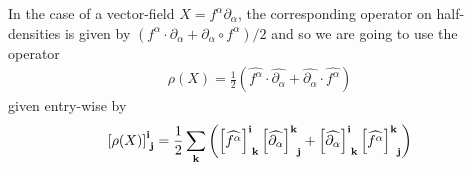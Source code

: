\documentclass[12pt]{amsart}
\begin{document}
In the case of a vector-field $X = f^\alpha \partial_\alpha$, the corresponding operator on half-densities is given by $ (f^\alpha \cdot \partial_\alpha + \partial_\alpha \circ f^\alpha)/2$
and so we are going to use the operator
\begin{align*}
	\rho(X) = \frac{1}{2} \left( \widehat{f^\alpha}  \cdot \widehat{\partial_{\alpha}} + \widehat{\partial_\alpha} \cdot \widehat{f^\alpha} \right)
\end{align*}
given entry-wise by
\begin{align*}
	\left[ \rho(X) \right] \indices{^{\bf i}_{\bf j}} = \frac{1}{2} \sum_{\bf k} \left(
		\left[ \widehat{f^\alpha} \right] \indices{^{\bf i}_{\bf k}}
		\left[\widehat{\partial_{\alpha}}\right] \indices{^{\bf k}_{\bf j}} +
		\left[\widehat{\partial_\alpha} \right] \indices{^{\bf i}_{\bf k}}
		\left[\widehat{f^\alpha}\right] \indices{^{\bf k}_{\bf j}}
		 \right)
\end{align*}



\end{document}
